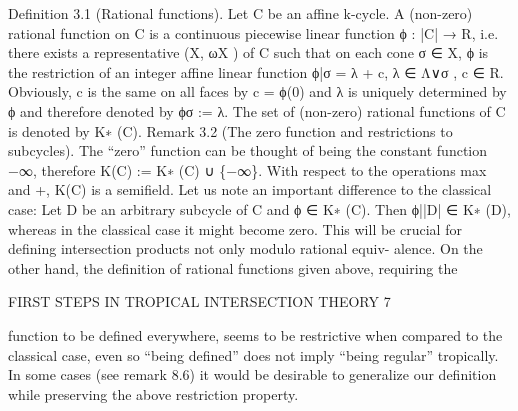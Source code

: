 \documentclass[
  11pt,
]{article}
\newenvironment{Shaded}{}{}
\newcommand{\NormalTok}[1]{#1}
\begin{document}
\begin{Shaded}
\begin{Highlighting}[]
\NormalTok{Definition 3.1 (Rational functions). Let C be an affine k{-}cycle. A (non{-}zero) rational}
\NormalTok{function on C is a continuous piecewise linear function ϕ : |C| → R, i.e. there exists}
\NormalTok{a representative (X, ωX ) of C such that on each cone σ ∈ X, ϕ is the restriction of an}
\NormalTok{integer affine linear function ϕ|σ = λ + c, λ ∈ Λ∨σ , c ∈ R. Obviously, c is the same on all}
\NormalTok{faces by c = ϕ(0) and λ is uniquely determined by ϕ and therefore denoted by ϕσ := λ.}
\NormalTok{The set of (non{-}zero) rational functions of C is denoted by K∗ (C).}
\NormalTok{Remark 3.2 (The zero function and restrictions to subcycles). The “zero” function can be}
\NormalTok{thought of being the constant function −∞, therefore K(C) := K∗ (C) ∪ \{−∞\}. With}
\NormalTok{respect to the operations max and +, K(C) is a semifield.}
\NormalTok{Let us note an important difference to the classical case: Let D be an arbitrary subcycle of}
\NormalTok{C and ϕ ∈ K∗ (C). Then ϕ||D| ∈ K∗ (D), whereas in the classical case it might become}
\NormalTok{zero. This will be crucial for defining intersection products not only modulo rational equiv{-}}
\NormalTok{alence. On the other hand, the definition of rational functions given above, requiring the}

\NormalTok{                              FIRST STEPS IN TROPICAL INTERSECTION THEORY                    7}


\NormalTok{function to be defined everywhere, seems to be restrictive when compared to the classical}
\NormalTok{case, even so “being defined” does not imply “being regular” tropically. In some cases (see}
\NormalTok{remark 8.6) it would be desirable to generalize our definition while preserving the above}
\NormalTok{restriction property.}


\end{Highlighting}
\end{Shaded}
\end{document}
